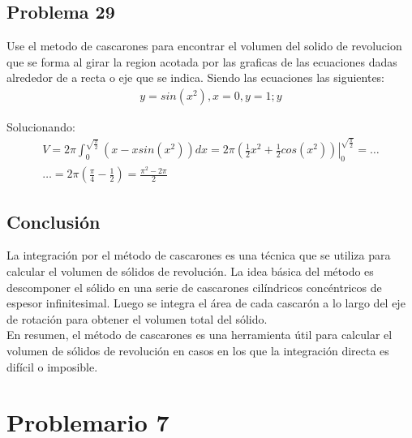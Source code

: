 \documentclass{article}
\begin{document}
\subsection{Problema 29}
Use el metodo de cascarones para encontrar el volumen del solido de revolucion que se forma al girar la region acotada por las graficas de las ecuaciones dadas alrededor de a recta o eje que se indica.
Siendo las ecuaciones las siguientes:
\begin{align*}
  y = sin (x^2) , x = 0, y = 1; y
\end{align*}

\begin{center}
\end{center}

Solucionando:
\begin{align*}
  V = 2\pi\int_{0}^{\sqrt{\frac{\pi}{2}}}(x-xsin(x^2))dx = 2\pi\left.\left(\frac{1}{2}x^2+\frac{1}{2}cos(x^2)\right)\right|_0^{\sqrt{\frac{\pi}{2}}} = \dots \\ \dots = 2\pi\left(\frac{\pi}{4}-\frac{1}{2}\right)=\frac{\pi^2-2\pi}{2}
\end{align*}

\subsection{Conclusión}
La integración por el método de cascarones es una técnica que se utiliza para calcular el volumen de sólidos de revolución. La idea básica del método es descomponer el sólido en una serie de cascarones cilíndricos concéntricos de espesor infinitesimal. Luego se integra el área de cada cascarón a lo largo del eje de rotación para obtener el volumen total del sólido.\\
En resumen, el método de cascarones es una herramienta útil para calcular el volumen de sólidos de revolución en casos en los que la integración directa es difícil o imposible.

\section{Problemario 7}
\end{document}
